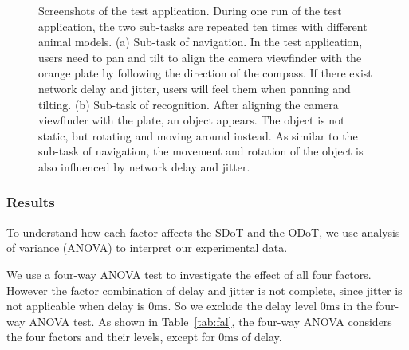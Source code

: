 \begin{figure}
	\centering
	\caption{Screenshots of the test application. During one run of the test application, the two sub-tasks are repeated ten times with different animal models. (a) Sub-task of navigation. In the test application, users need to pan and tilt to align the camera viewfinder with the orange plate by following the direction of the compass. If there exist network delay and jitter, users will feel them when panning and tilting. (b) Sub-task of recognition. After aligning the camera viewfinder with the plate, an object appears. The object is not static, but rotating and moving around instead. As similar to the sub-task of navigation, the movement and rotation of the object is also influenced by network delay and jitter.}
	\label{fig:us}
\end{figure}

\subsubsection{Results}
\label{sec:hrr:us:r}

To understand how each factor affects the SDoT and the ODoT, we use analysis of variance (ANOVA) to interpret our experimental data.

We use a four-way ANOVA test to investigate the effect of all four factors. However the factor combination of delay and jitter is not complete, since jitter is not applicable when delay is $0\mathrm{ms}$. So we exclude the delay level $0\mathrm{ms}$ in the four-way ANOVA test.
As shown in Table~\ref{tab:fal}, the four-way ANOVA considers the four factors and their levels, except for $0\mathrm{ms}$ of delay.

